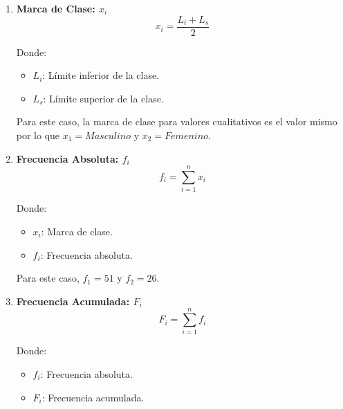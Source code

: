 \documentclass{article}
\begin{document}
  \begin{multicols}{2}
    \begin{enumerate}
      \item \begin{center}
        \textbf{Marca de Clase: $x_i$}
        \hrulefill
        \begin{equation*}
            x_i = \frac{L_i + L_s}{2}
        \end{equation*}
    \end{center}
    \vspace{-0.5cm}
    Donde:
    \begin{itemize}
        \item $L_i$: Límite inferior de la clase.
        \item $L_s$: Límite superior de la clase.
    \end{itemize}
    Para este caso, la marca de clase para valores cualitativos es el valor mismo por lo que $x_1 = Masculino$ y $x_2 = Femenino$.

    \item \begin{center}
        \textbf{Frecuencia Absoluta: $f_i$}
        \hrulefill
        \begin{equation*}
          f_i = \sum_{i=1}^{n} x_i
        \end{equation*}
    \end{center}
    \vspace{-0.7cm}
    Donde:
    \begin{itemize}
        \item $x_i$: Marca de clase.
        \item $f_i$: Frecuencia absoluta.
    \end{itemize}
    Para este caso, $f_1 = 51$ y $f_2 = 26$.

    \item \begin{center}
      \textbf{Frecuencia Acumulada: $F_i$}
      \hrulefill
      \begin{equation*}
        F_i = \sum_{i=1}^{n} f_i
      \end{equation*}
    \end{center}
    \vspace{-0.5cm}
    Donde:
    \begin{itemize}
        \item $f_i$: Frecuencia absoluta.
        \item $F_i$: Frecuencia acumulada.
    \end{itemize}


\end{enumerate}
\end{multicols}
\end{document}
